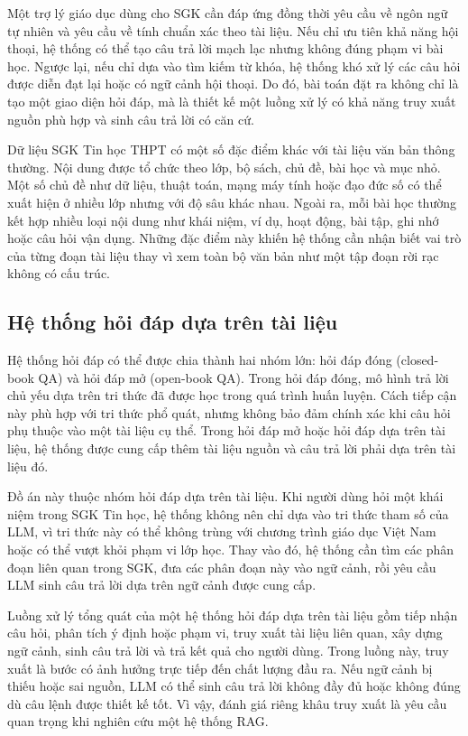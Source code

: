 \documentclass[../DoAn.tex]{subfiles}
\begin{document}
Một trợ lý giáo dục dùng cho SGK cần đáp ứng đồng thời yêu cầu về ngôn ngữ tự nhiên và yêu cầu về tính chuẩn xác theo tài liệu. Nếu chỉ ưu tiên khả năng hội thoại, hệ thống có thể tạo câu trả lời mạch lạc nhưng không đúng phạm vi bài học. Ngược lại, nếu chỉ dựa vào tìm kiếm từ khóa, hệ thống khó xử lý các câu hỏi được diễn đạt lại hoặc có ngữ cảnh hội thoại. Do đó, bài toán đặt ra không chỉ là tạo một giao diện hỏi đáp, mà là thiết kế một luồng xử lý có khả năng truy xuất nguồn phù hợp và sinh câu trả lời có căn cứ.

Dữ liệu SGK Tin học THPT có một số đặc điểm khác với tài liệu văn bản thông thường. Nội dung được tổ chức theo lớp, bộ sách, chủ đề, bài học và mục nhỏ. Một số chủ đề như dữ liệu, thuật toán, mạng máy tính hoặc đạo đức số có thể xuất hiện ở nhiều lớp nhưng với độ sâu khác nhau. Ngoài ra, mỗi bài học thường kết hợp nhiều loại nội dung như khái niệm, ví dụ, hoạt động, bài tập, ghi nhớ hoặc câu hỏi vận dụng. Những đặc điểm này khiến hệ thống cần nhận biết vai trò của từng đoạn tài liệu thay vì xem toàn bộ văn bản như một tập đoạn rời rạc không có cấu trúc.

\subsection{Hệ thống hỏi đáp dựa trên tài liệu}

Hệ thống hỏi đáp có thể được chia thành hai nhóm lớn: hỏi đáp đóng (closed-book QA) và hỏi đáp mở (open-book QA). Trong hỏi đáp đóng, mô hình trả lời chủ yếu dựa trên tri thức đã được học trong quá trình huấn luyện. Cách tiếp cận này phù hợp với tri thức phổ quát, nhưng không bảo đảm chính xác khi câu hỏi phụ thuộc vào một tài liệu cụ thể. Trong hỏi đáp mở hoặc hỏi đáp dựa trên tài liệu, hệ thống được cung cấp thêm tài liệu nguồn và câu trả lời phải dựa trên tài liệu đó.

Đồ án này thuộc nhóm hỏi đáp dựa trên tài liệu. Khi người dùng hỏi một khái niệm trong SGK Tin học, hệ thống không nên chỉ dựa vào tri thức tham số của LLM, vì tri thức này có thể không trùng với chương trình giáo dục Việt Nam hoặc có thể vượt khỏi phạm vi lớp học. Thay vào đó, hệ thống cần tìm các phân đoạn liên quan trong SGK, đưa các phân đoạn này vào ngữ cảnh, rồi yêu cầu LLM sinh câu trả lời dựa trên ngữ cảnh được cung cấp.

Luồng xử lý tổng quát của một hệ thống hỏi đáp dựa trên tài liệu gồm tiếp nhận câu hỏi, phân tích ý định hoặc phạm vi, truy xuất tài liệu liên quan, xây dựng ngữ cảnh, sinh câu trả lời và trả kết quả cho người dùng. Trong luồng này, truy xuất là bước có ảnh hưởng trực tiếp đến chất lượng đầu ra. Nếu ngữ cảnh bị thiếu hoặc sai nguồn, LLM có thể sinh câu trả lời không đầy đủ hoặc không đúng dù câu lệnh được thiết kế tốt. Vì vậy, đánh giá riêng khâu truy xuất là yêu cầu quan trọng khi nghiên cứu một hệ thống RAG.
\end{document}
